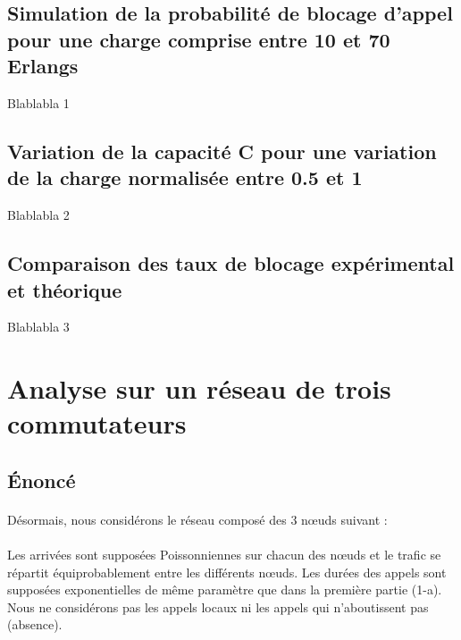         \subsection{Simulation de la probabilité de blocage d'appel pour une charge comprise entre 10 et 70 Erlangs}
Blablabla 1
%
        \subsection{Variation de la capacité C pour une variation de la charge normalisée entre 0.5 et 1}
Blablabla 2
%
        \subsection{Comparaison des taux de blocage expérimental et théorique}
Blablabla 3
%
    \clearpage
%
%
%
    \section{Analyse sur un réseau de trois commutateurs}
%
        \subsection{Énoncé}
%
            \paragraph{}
Désormais, nous considérons le réseau composé des 3 nœuds suivant :
%
            \paragraph{}
Les arrivées sont supposées Poissonniennes sur chacun des nœuds et le trafic se répartit équiprobablement entre les différents nœuds.
Les durées des appels sont supposées exponentielles de même paramètre que dans la première partie (1-a).
Nous ne considérons pas les appels locaux ni les appels qui n'aboutissent pas (absence).
%
